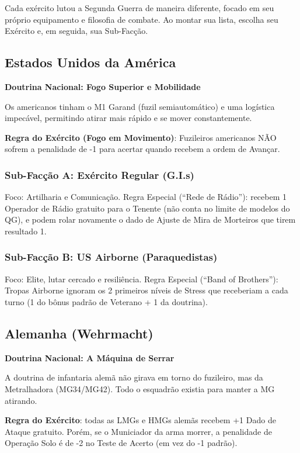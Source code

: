 Cada exército lutou a Segunda Guerra de maneira diferente, focado em seu próprio equipamento e filosofia de combate. Ao montar sua lista, escolha seu Exército e, em seguida, sua Sub-Facção.

\subsection{Estados Unidos da América}

\textbf{Doutrina Nacional: Fogo Superior e Mobilidade}

Os americanos tinham o M1 Garand (fuzil semiautomático) e uma logística impecável, permitindo atirar mais rápido e se mover constantemente.

\textbf{Regra do Exército (Fogo em Movimento)}: Fuzileiros americanos NÃO sofrem a penalidade de -1 para acertar quando recebem a ordem de Avançar.

\subsubsection{Sub-Facção A: Exército Regular (G.I.s)}

Foco: Artilharia e Comunicação. Regra Especial (``Rede de Rádio''): recebem 1 Operador de Rádio gratuito para o Tenente (não conta no limite de modelos do QG), e podem rolar novamente o dado de Ajuste de Mira de Morteiros que tirem resultado 1.

\subsubsection{Sub-Facção B: US Airborne (Paraquedistas)}

Foco: Elite, lutar cercado e resiliência. Regra Especial (``Band of Brothers''): Tropas Airborne ignoram os 2 primeiros níveis de Stress que receberiam a cada turno (1 do bônus padrão de Veterano + 1 da doutrina).

\subsection{Alemanha (Wehrmacht)}

\textbf{Doutrina Nacional: A Máquina de Serrar}

A doutrina de infantaria alemã não girava em torno do fuzileiro, mas da Metralhadora (MG34/MG42). Todo o esquadrão existia para manter a MG atirando.

\textbf{Regra do Exército}: todas as LMGs e HMGs alemãs recebem +1 Dado de Ataque gratuito. Porém, se o Municiador da arma morrer, a penalidade de Operação Solo é de -2 no Teste de Acerto (em vez do -1 padrão).

